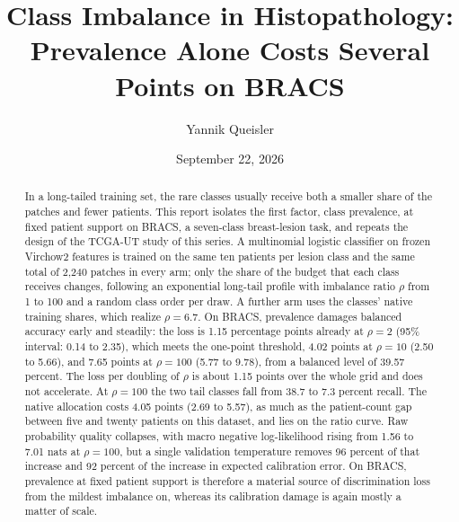\documentclass[11pt]{article}
\title{Class Imbalance in Histopathology:\\Prevalence Alone Costs Several Points on BRACS}
\author{Yannik Queisler}
\date{September 22, 2026}
\begin{document}
\raggedbottom
{}
\setlength{\emergencystretch}{2em}
\maketitle
\begin{abstract}
\noindent In a long-tailed training set, the rare classes usually receive both a smaller share of the patches and fewer patients. This report isolates the first factor, class prevalence, at fixed patient support on BRACS, a seven-class breast-lesion task, and repeats the design of the TCGA-UT study of this series. A multinomial logistic classifier on frozen Virchow2 features is trained on the same ten patients per lesion class and the same total of 2,240 patches in every arm; only the share of the budget that each class receives changes, following an exponential long-tail profile with imbalance ratio $\rho$ from 1 to 100 and a random class order per draw. A further arm uses the classes' native training shares, which realize $\rho=6.7$. On BRACS, prevalence damages balanced accuracy early and steadily: the loss is 1.15 percentage points already at $\rho=2$ (95\% interval: 0.14 to 2.35), which meets the one-point threshold, 4.02 points at $\rho=10$ (2.50 to 5.66), and 7.65 points at $\rho=100$ (5.77 to 9.78), from a balanced level of 39.57 percent. The loss per doubling of $\rho$ is about 1.15 points over the whole grid and does not accelerate. At $\rho=100$ the two tail classes fall from 38.7 to 7.3 percent recall. The native allocation costs 4.05 points (2.69 to 5.57), as much as the patient-count gap between five and twenty patients on this dataset, and lies on the ratio curve. Raw probability quality collapses, with macro negative log-likelihood rising from 1.56 to 7.01 nats at $\rho=100$, but a single validation temperature removes 96 percent of that increase and 92 percent of the increase in expected calibration error. On BRACS, prevalence at fixed patient support is therefore a material source of discrimination loss from the mildest imbalance on, whereas its calibration damage is again mostly a matter of scale.
\end{abstract}
\end{document}
